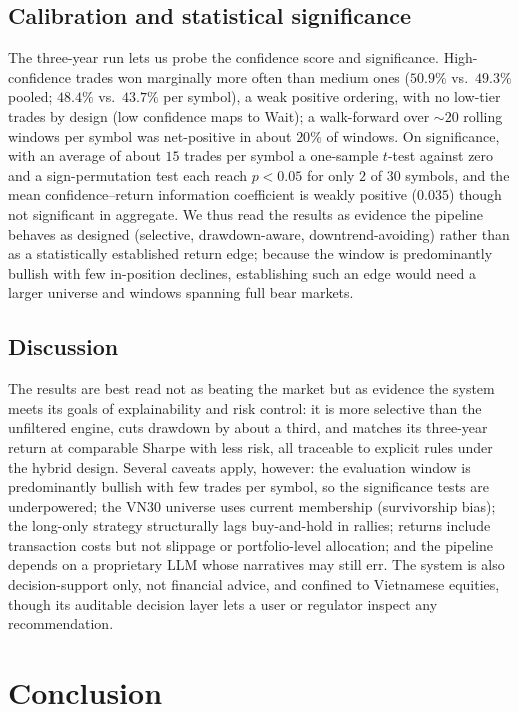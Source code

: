 \documentclass[runningheads]{llncs}
\begin{document}
\subsection{Calibration and statistical significance}
The three-year run lets us probe the confidence score and significance.
High-confidence trades won marginally more often than medium ones ($50.9\%$ vs.\
$49.3\%$ pooled; $48.4\%$ vs.\ $43.7\%$ per symbol), a weak positive ordering,
with no low-tier trades by design (low confidence maps to \textsf{Wait}); a
walk-forward over ${\sim}20$ rolling windows per symbol was net-positive in about
$20\%$ of windows. On significance, with an average of about $15$ trades per
symbol a one-sample $t$-test against zero and a sign-permutation test each reach
$p<0.05$ for only $2$ of $30$ symbols, and the mean confidence--return information
coefficient is weakly positive ($0.035$) though not significant in aggregate. We
thus read the results as evidence the pipeline behaves as designed (selective,
drawdown-aware, downtrend-avoiding) rather than as a statistically established
return edge; because the window is predominantly bullish with few in-position
declines, establishing such an edge would need a larger universe and windows
spanning full bear markets.

\subsection{Discussion}
\label{sec:discussion}
The results are best read not as beating the market but as evidence the system
meets its goals of explainability and risk control: it is more selective than the
unfiltered engine, cuts drawdown by about a third, and matches its three-year
return at comparable Sharpe with less risk, all traceable to explicit rules under
the hybrid design. Several caveats apply, however: the evaluation window is
predominantly bullish with few trades per symbol, so the significance tests are
underpowered; the VN30 universe uses current membership (survivorship bias); the
long-only strategy structurally lags buy-and-hold in rallies; returns include
transaction costs but not slippage or portfolio-level allocation; and the pipeline
depends on a proprietary LLM whose narratives may still err. The system is also
decision-support only, not financial advice, and confined to Vietnamese equities,
though its auditable decision layer lets a user or regulator inspect any
recommendation.

\section{Conclusion}
\label{sec:conclusion}
\end{document}
